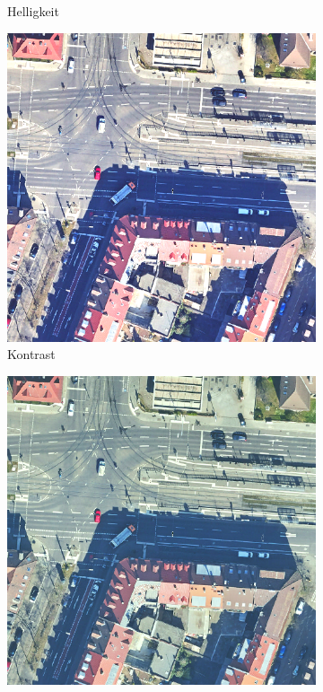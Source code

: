 \begin{figure}
\begin{subfigure}{.32\textwidth}
		Helligkeit
	\end{subfigure} 
	\begin{subfigure}{.32\textwidth}
		\centering
		\includegraphics[width=1.\linewidth]{Bilder/color_aug/RandomContrast.png}
		Kontrast
	\end{subfigure} 
	\begin{subfigure}{.32\textwidth}
		\centering
		\includegraphics[width=1.\linewidth]{Bilder/color_aug/RGBShift.png}

\end{subfigure}
\end{figure}
